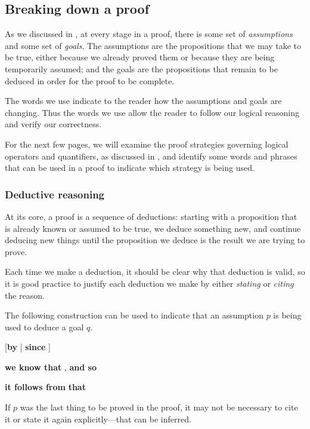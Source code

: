 \subsection*{Breaking down a proof}

As we discussed in , at every stage in a proof, there is some set of \textit{assumptions} and some set of \textit{goals}. The assumptions are the propositions that we may take to be true, either because we already proved them or because they are being temporarily assumed; and the goals are the propositions that remain to be deduced in order for the proof to be complete.

The words we use indicate to the reader how the assumptions and goals are changing. Thus the words we use allow the reader to follow our logical reasoning and verify our correctness.

For the next few pages, we will examine the proof strategies governing logical operators and quantifiers, as discussed in , and identify some words and phrases that can be used in a proof to indicate which strategy is being used.

\subsubsection*{Deductive reasoning}

At its core, a proof is a sequence of deductions: starting with a proposition that is already known or assumed to be true, we deduce something new, and continue deducing new things until the proposition we deduce is the result we are trying to prove.

Each time we make a deduction, it should be clear why that deduction is valid, so it is good practice to justify each deduction we make by either \textit{stating} or \textit{citing} the reason.

\begin{vocabulary}
\label{vcbBy}
The following construction can be used to indicate that an assumption $p$ is being used to deduce a goal $q$.

\begin{vocabtemplate}
  [\textbf{by}  | \textbf{since} ]

\vtor

\textbf{we know that} , \textbf{and so} 

\vtor

\textbf{it follows from}  \textbf{that} 
\end{vocabtemplate}

If $p$ was the last thing to be proved in the proof, it may not be necessary to cite it or state it again explicitly---that can be inferred.
\end{vocabulary}

